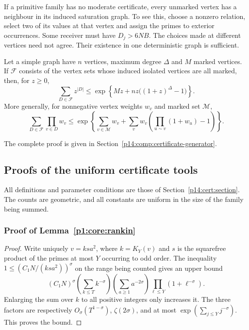 If a primitive family has no moderate certificate, every unmarked
vertex has a neighbour in its induced saturation graph. To see this,
choose a nonzero relation, select two of its values at that vertex and
assign the primes to exterior occurrences. Some receiver must have
$D_j>6NB$. The choices made at different vertices need not agree.
Their existence in one deterministic graph is sufficient.

\begin{lemma}
\label{p1:core:generator}
Let a simple graph have $n$ vertices, maximum degree $\Delta$ and
$M$ marked vertices. If $\mathcal F$ consists of the vertex sets
whose induced isolated vertices are all marked, then, for $z\ge0$,
\begin{equation}
 \sum_{D\in\mathcal F}z^{|D|}
 \le\exp\left\{Mz+nz\bigl((1+z)^\Delta-1\bigr)\right\}.
 \label{p1:core:generator-bound}
\end{equation}
More generally, for nonnegative vertex weights $w_v$ and marked set
$\mathcal M$,
\[
 \sum_{D\in\mathcal F}\prod_{v\in D}w_v
 \le \exp\left\{\sum_{v\in\mathcal M}w_v+
 \sum_vw_v\left(\prod_{u\sim v}(1+w_u)-1\right)\right\}.
\]
\end{lemma}
\noindent The complete proof is given in Section~\ref{p14:comp:certificate-generator}.

\subsection{Proofs of the uniform certificate tools}
\label{p14:comp:certificate-tools}

All definitions and parameter conditions are those of
Section~\ref{p14:cert:section}. The counts are geometric, and all
constants are uniform in the size of the family being summed.

\subsubsection{Proof of Lemma~\ref{p1:core:rankin}}
\label{p14:comp:certificate-rankin}

\begin{proof}
Write uniquely $v=k s a^2$, where $k=K_Y(v)$ and $s$ is the
squarefree product of the primes at most $Y$ occurring to odd order.
The inequality $1\le (C_1N/(ksa^2))^\sigma$ on the range being
counted gives an upper bound
\[
 (C_1N)^\sigma
 \left(\sum_{k\le T}k^{-\sigma}\right)
 \left(\sum_{a\ge1}a^{-2\sigma}\right)
 \prod_{\ell\le Y}(1+\ell^{-\sigma}).
\]
Enlarging the sum over $k$ to all positive integers only increases it.
The three factors are respectively $O_\sigma(T^{1-\sigma})$,
$\zeta(2\sigma)$, and at most
$\exp(\sum_{j\le Y}j^{-\sigma})$. This proves the bound.
\end{proof}

